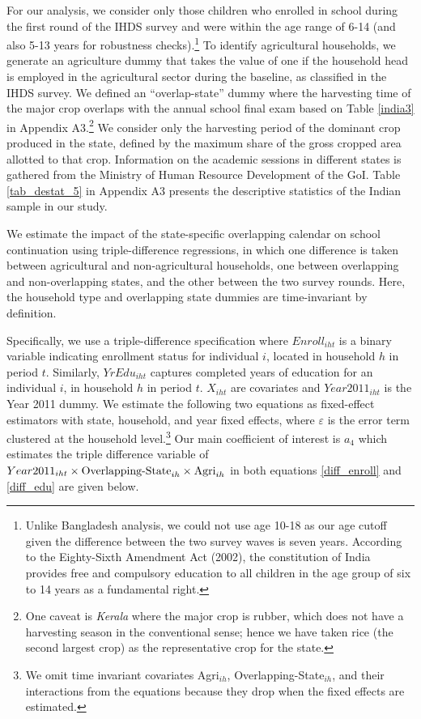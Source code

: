 \documentclass[12pt,letterpaper]{article}\usepackage[margin=1in]{geometry}
\newcommand{\0}{\ensuremath{\mbox{\boldmath $0$}}}
\begin{document}
For our analysis, we consider only those children who enrolled in school during the first round of the IHDS survey and were within the age range of 6-14 (and also 5-13 years for robustness checks).\footnote{Unlike Bangladesh analysis, we could not use age 10-18 as our age cutoff given the difference between the two survey waves is seven years. According to the Eighty-Sixth Amendment Act (2002), the constitution of India provides free and compulsory education to all children in the age group of six to 14 years as a fundamental right.} To identify agricultural households, we generate an agriculture dummy that takes the value of one if the household head is employed in the agricultural sector during the baseline, as classified in the IHDS survey.  We defined an ``overlap-state'' dummy where the harvesting time of the major crop overlaps with the annual school final exam based on Table \ref{india3} in Appendix A3.\footnote{One caveat is \textit{Kerala} where the major crop is rubber, which does not have a harvesting season in the conventional sense; hence we have taken rice (the second largest crop) as the representative crop for the state.} We consider only the harvesting period of the dominant crop produced in the state, defined by the maximum share of the gross cropped area allotted to that crop. Information on the academic sessions in different states is gathered from the Ministry of Human Resource Development of the GoI. Table \ref{tab_destat_5} in Appendix A3 presents the descriptive statistics of the Indian sample in our study.

We estimate the impact of the state-specific overlapping calendar on school continuation using triple-difference regressions, in which one difference is taken between agricultural and non-agricultural households, one between overlapping and non-overlapping states, and the other between the two survey rounds. Here, the household type and overlapping state dummies are time-invariant by definition.

Specifically, we use a triple-difference specification where ${Enroll}_{iht}$ is a binary variable indicating enrollment status for individual $i$, located in household $h$ in period $t$. Similarly, ${YrEdu}_{iht}$ captures completed years of education for an individual $i$, in household $h$ in period $t$. ${X}_{iht}$ are covariates and ${Year2011}_{iht}$ is the Year 2011 dummy. We estimate the following two equations as fixed-effect estimators with state, household, and year fixed effects, where $\varepsilon$ is the error term clustered at the household level.\footnote{We omit time invariant covariates Agri$_{ih}$, Overlapping-State$_{ih}$, and their interactions from the equations because they drop when the fixed effects are estimated. } Our main coefficient of interest is $a_4$ which estimates the triple difference variable of ${Year2011}_{iht}\times \textnormal{Overlapping-State}_{ih}\times\textnormal{Agri}_{ih}$ in both equations \ref{diff_enroll} and \ref{diff_edu} are given below.
\end{document}
